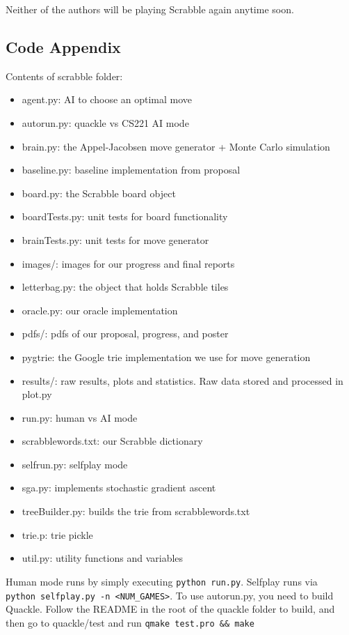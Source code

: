 \documentclass[12pt]{article}
\begin{document}
Neither of the authors will be playing Scrabble again anytime soon.

\clearpage
\begin{center}
 \section*{Code Appendix}
\end{center}
Contents of scrabble folder:
\begin{itemize}
\setlength\itemsep{-0.22em}
\item agent.py: AI to choose an optimal move
\item autorun.py: quackle vs CS221 AI mode
\item brain.py: the Appel-Jacobsen move generator + Monte Carlo simulation
\item baseline.py: baseline implementation from proposal
\item board.py: the Scrabble board object 
\item boardTests.py: unit tests for board functionality
\item brainTests.py: unit tests for move generator
\item images/: images for our progress and final reports
\item letterbag.py: the object that holds Scrabble tiles
\item oracle.py: our oracle implementation
\item pdfs/: pdfs of our proposal, progress, and poster
\item pygtrie: the Google trie implementation we use for move generation
\item results/: raw results, plots and statistics. Raw data stored and processed in plot.py
\item run.py: human vs AI mode
\item scrabblewords.txt: our Scrabble dictionary
\item selfrun.py: selfplay mode
\item sga.py: implements stochastic gradient ascent
\item treeBuilder.py: builds the trie from scrabblewords.txt
\item trie.p: trie pickle
\item util.py: utility functions and variables
\end{itemize}

Human mode runs by simply executing \verb|python run.py|. Selfplay
runs via\\ \verb|python selfplay.py -n <NUM_GAMES>|. To use
autorun.py, you need to build Quackle. Follow the README in the root
of the quackle folder to build, and then go to quackle/test and
run \verb|qmake test.pro && make|
\end{document}
